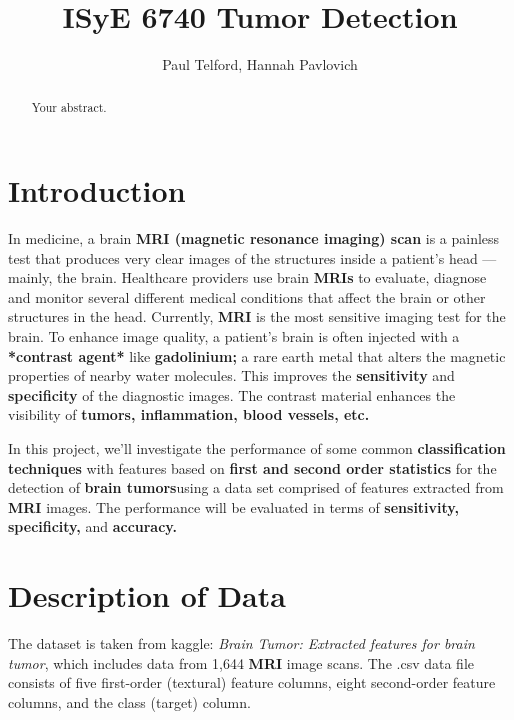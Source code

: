 \documentclass{article}
\title{ISyE 6740 Tumor Detection}
\author{Paul Telford, Hannah Pavlovich}
\begin{document}
\maketitle

\begin{abstract}
Your abstract.
\end{abstract}

\tableofcontents

\section{Introduction}

In medicine, a brain \textbf{MRI (magnetic resonance imaging) scan} is a painless test that produces very clear images of the structures inside a patient's head — mainly, the brain. Healthcare providers use brain \textbf{MRIs} to evaluate, diagnose and monitor several different medical conditions that affect the brain or other structures in the head. Currently, \textbf{MRI} is the most sensitive imaging test for the brain. To enhance image quality, a patient's brain is often injected with a \textbf{*contrast agent*} like \textbf{gadolinium;} a rare earth metal that alters the magnetic properties of nearby water molecules. This improves the \textbf{sensitivity} and \textbf{specificity} of the diagnostic images. The contrast material enhances the visibility of \textbf{tumors, inflammation, blood vessels, etc.}

In this project, we'll investigate the performance of some common \textbf{classification techniques} with features based on \textbf{first and second order statistics} for the detection of \textbf{brain tumors}using a data set comprised of features extracted from \textbf{MRI} images. The performance will be evaluated in terms of \textbf{sensitivity, specificity,} and \textbf{accuracy.}

\section{Description of Data}\label{description-data}

The dataset is taken from kaggle: \textit{Brain Tumor: Extracted features for brain tumor}\cite{kaggle-set}, which includes data from 1,644 \textbf{MRI} image scans. The .csv data file consists of five first-order (textural) feature columns, eight second-order feature columns, and the class (target) column.
\end{document}
